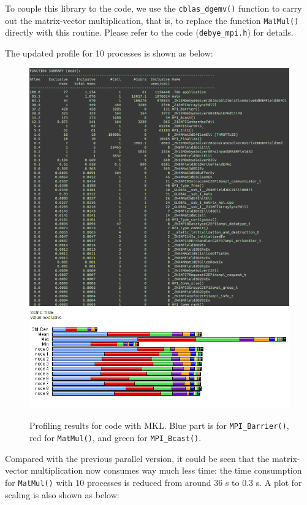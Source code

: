 \documentclass{article}
\begin{document}
\begin{spacing}{1.1}
To couple this library to the code, we use the \texttt{cblas\_dgemv()} function to carry out the matrix-vector multiplication, that is, to replace the function \texttt{MatMul()} directly with this routine. Please refer to the code (\texttt{debye\_mpi.h}) for details.

The updated profile for 10 processes is shown as below:

\begin{figure}[H]
\centering
      \includegraphics[width=0.8\linewidth]{output/mkl-profile-text.png}
      \includegraphics[width=0.8\linewidth]{output/mkl-profile.png}
  \caption{Profiling results for code with MKL. Blue part is for \texttt{MPI\_Barrier()}, red for \texttt{MatMul()}, and green for \texttt{MPI\_Bcast()}.}
\end{figure}

Compared with the previous parallel version, it could be seen that the matrix-vector multiplication now consumes way much less time: the time consumption for \texttt{MatMul()} with 10 processes is reduced from around 36 s to 0.3 s. A plot for scaling is also shown as below:


\end{spacing}
\end{document}
